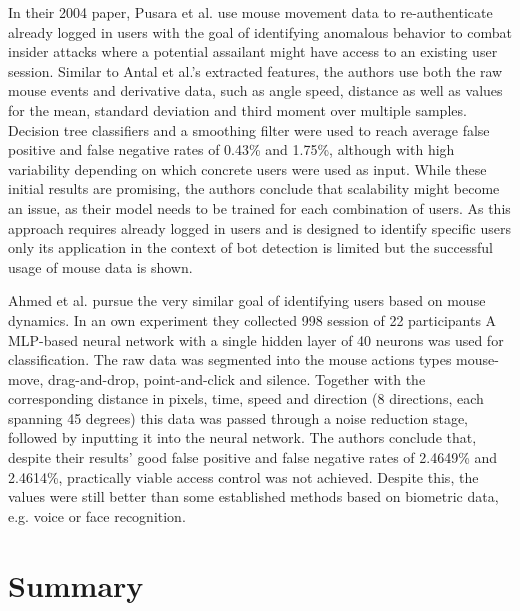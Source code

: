 \documentclass[
    fontsize=12pt,
    headings=small,
    parskip=half,           %
    bibliography=totoc,
    numbers=noenddot,       %
    open=any,               %
    final,                   %
    table
]{scrreprt}
\begin{document}
In their 2004 paper, Pusara et al. \cite{10.1145/1029208.1029210} use mouse movement data to re-authenticate already logged in users with the goal of identifying anomalous behavior to combat insider attacks where a potential assailant might have access to an existing user session. Similar to Antal et al.'s \cite{https://doi.org/10.1049/iet-bmt.2018.5126} extracted features, the authors use both the raw mouse events and derivative data, such as angle speed, distance as well as values for the mean, standard deviation and third moment over multiple samples. Decision tree classifiers and a smoothing filter were used to reach average false positive and false negative rates of 0.43\% and 1.75\%, although with high variability depending on which concrete users were used as input. While these initial results are promising, the authors conclude that scalability might become an issue, as their model needs to be trained for each combination of users. As this approach requires already logged in users and is designed to identify specific users only its application in the context of bot detection is limited but the successful usage of mouse data is shown.

Ahmed et al. pursue the very similar goal of identifying users based on mouse dynamics. In an own experiment they collected 998 session of 22 participants
A MLP-based neural network with a single hidden layer of 40 neurons was used for classification. The raw data was segmented into the mouse actions types mouse-move, drag-and-drop, point-and-click and silence. Together with the corresponding distance in pixels, time, speed and direction (8 directions, each spanning 45 degrees) this data was passed through a noise reduction stage, followed by inputting it into the neural network. The authors conclude that, despite their results' good false positive and false negative rates of 2.4649\% and 2.4614\%, practically viable access control was not achieved. Despite this, the values were still better than some established methods based on biometric data, e.g. voice or face recognition.

\section{Summary}
\end{document}
